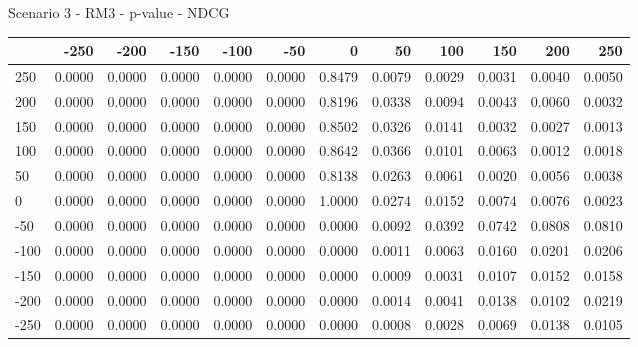 Scenario 3 - RM3 - p-value - NDCG
\begin{tabular}{lrrrrrrrrrrr}
\toprule
{} &   -250 &   -200 &   -150 &   -100 &   -50  &    0   &    50  &    100 &    150 &    200 &    250 \\
\midrule
 250 & 0.0000 & 0.0000 & 0.0000 & 0.0000 & 0.0000 & 0.8479 & 0.0079 & 0.0029 & 0.0031 & 0.0040 & 0.0050 \\
 200 & 0.0000 & 0.0000 & 0.0000 & 0.0000 & 0.0000 & 0.8196 & 0.0338 & 0.0094 & 0.0043 & 0.0060 & 0.0032 \\
 150 & 0.0000 & 0.0000 & 0.0000 & 0.0000 & 0.0000 & 0.8502 & 0.0326 & 0.0141 & 0.0032 & 0.0027 & 0.0013 \\
 100 & 0.0000 & 0.0000 & 0.0000 & 0.0000 & 0.0000 & 0.8642 & 0.0366 & 0.0101 & 0.0063 & 0.0012 & 0.0018 \\
 50  & 0.0000 & 0.0000 & 0.0000 & 0.0000 & 0.0000 & 0.8138 & 0.0263 & 0.0061 & 0.0020 & 0.0056 & 0.0038 \\
 0   & 0.0000 & 0.0000 & 0.0000 & 0.0000 & 0.0000 & 1.0000 & 0.0274 & 0.0152 & 0.0074 & 0.0076 & 0.0023 \\
-50  & 0.0000 & 0.0000 & 0.0000 & 0.0000 & 0.0000 & 0.0000 & 0.0092 & 0.0392 & 0.0742 & 0.0808 & 0.0810 \\
-100 & 0.0000 & 0.0000 & 0.0000 & 0.0000 & 0.0000 & 0.0000 & 0.0011 & 0.0063 & 0.0160 & 0.0201 & 0.0206 \\
-150 & 0.0000 & 0.0000 & 0.0000 & 0.0000 & 0.0000 & 0.0000 & 0.0009 & 0.0031 & 0.0107 & 0.0152 & 0.0158 \\
-200 & 0.0000 & 0.0000 & 0.0000 & 0.0000 & 0.0000 & 0.0000 & 0.0014 & 0.0041 & 0.0138 & 0.0102 & 0.0219 \\
-250 & 0.0000 & 0.0000 & 0.0000 & 0.0000 & 0.0000 & 0.0000 & 0.0008 & 0.0028 & 0.0069 & 0.0138 & 0.0105 \\
\bottomrule
\end{tabular}

